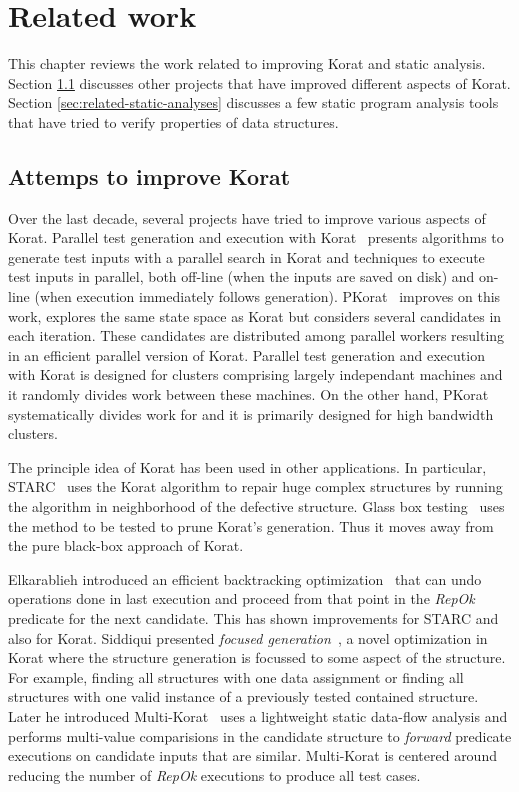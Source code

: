 \chapter{Related work}
\label{ch:related-work}
This chapter reviews the work related to improving Korat and static
analysis. Section \ref{sec:attempts-to-improve-korat} discusses other
projects that have improved different aspects of Korat. Section
\ref{sec:related-static-analyses} discusses a few static program
analysis tools that have tried to verify properties of data
structures.

\section{Attemps to improve Korat}
\label{sec:attempts-to-improve-korat}
Over the last decade, several projects have tried to improve various
aspects of Korat. Parallel test generation and execution with
Korat~\cite{misailovic2007parallel} presents algorithms to generate
test inputs with a parallel search in Korat and techniques to execute
test inputs in parallel, both off-line (when the inputs are saved on
disk) and on-line (when execution immediately follows
generation). PKorat~\cite{siddiqui2009pkorat} improves on this work,
explores the same state space as Korat but considers several
candidates in each iteration. These candidates are distributed among
parallel workers resulting in an efficient parallel version of
Korat. Parallel test generation and execution with Korat is designed
for clusters comprising largely independant machines and it randomly
divides work between these machines.  On the other hand, PKorat
systematically divides work for and it is primarily designed for high
bandwidth clusters.

The principle idea of Korat has been used in other applications. In
particular, STARC~\cite{elkarablieh2007starc} uses the Korat algorithm
to repair huge complex structures by running the algorithm in
neighborhood of the defective structure. Glass box
testing~\cite{darga2006efficient} uses the method to be tested to
prune Korat’s generation. Thus it moves away from the pure black-box
approach of Korat.

Elkarablieh introduced an efficient backtracking
optimization~\cite{elkarablieh2008efficient} that can undo operations
done in last execution and proceed from that point in the \emph{RepOk}
predicate for the next candidate.  This has shown improvements for
STARC and also for Korat. Siddiqui presented \emph{focused
  generation}~\cite{siddiqui2009optimizing}, a novel optimization in
Korat where the structure generation is focussed to some aspect of the
structure. For example, finding all structures with one data
assignment or finding all structures with one valid instance of a
previously tested contained structure. Later he introduced
Multi-Korat~\cite{siddiqui2012lightweight} uses a lightweight static
data-flow analysis and performs multi-value comparisions in the
candidate structure to \emph{forward} predicate executions on
candidate inputs that are similar. Multi-Korat is centered around
reducing the number of \emph{RepOk} executions to produce all test
cases.


